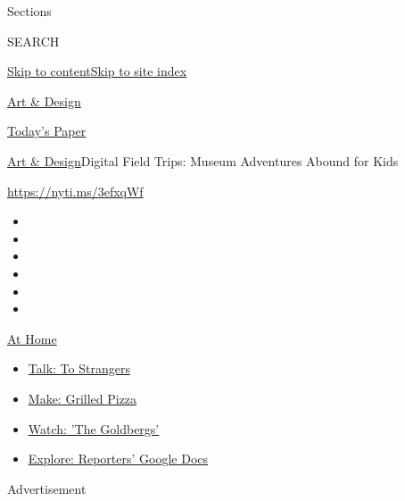 Sections

SEARCH

\protect\hyperlink{site-content}{Skip to
content}\protect\hyperlink{site-index}{Skip to site index}

\href{https://www.nytimes.com/section/arts/design}{Art \& Design}

\href{https://myaccount.nytimes.com/auth/login?response_type=cookie\&client_id=vi}{}

\href{https://www.nytimes.com/section/todayspaper}{Today's Paper}

\href{/section/arts/design}{Art \& Design}\textbar{}Digital Field Trips:
Museum Adventures Abound for Kids

\url{https://nyti.ms/3efxqWf}

\begin{itemize}
\item
\item
\item
\item
\item
\item
\end{itemize}

\href{https://www.nytimes.com/spotlight/at-home?action=click\&pgtype=Article\&state=default\&region=TOP_BANNER\&context=at_home_menu}{At
Home}

\begin{itemize}
\tightlist
\item
  \href{https://www.nytimes.com/2020/08/03/well/family/the-benefits-of-talking-to-strangers.html?action=click\&pgtype=Article\&state=default\&region=TOP_BANNER\&context=at_home_menu}{Talk:
  To Strangers}
\item
  \href{https://www.nytimes.com/2020/08/01/at-home/coronavirus-make-pizza-on-a-grill.html?action=click\&pgtype=Article\&state=default\&region=TOP_BANNER\&context=at_home_menu}{Make:
  Grilled Pizza}
\item
  \href{https://www.nytimes.com/2020/07/31/arts/television/goldbergs-abc-stream.html?action=click\&pgtype=Article\&state=default\&region=TOP_BANNER\&context=at_home_menu}{Watch:
  'The Goldbergs'}
\item
  \href{https://www.nytimes.com/interactive/2020/at-home/even-more-reporters-editors-diaries-lists-recommendations.html?action=click\&pgtype=Article\&state=default\&region=TOP_BANNER\&context=at_home_menu}{Explore:
  Reporters' Google Docs}
\end{itemize}

Advertisement

